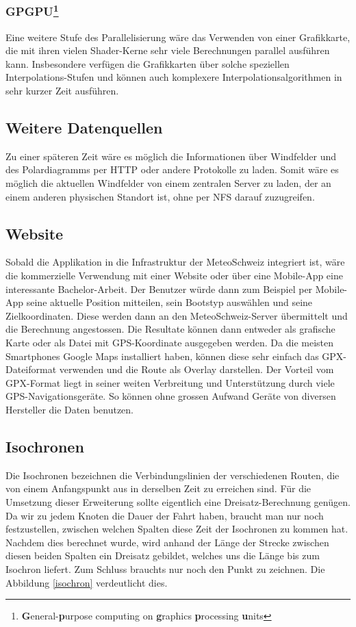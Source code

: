 \subsubsection{GPGPU\protect\footnote{\textbf{G}eneral-\textbf{p}urpose computing on \textbf{g}raphics \textbf{p}rocessing \textbf{u}nits}}
Eine weitere Stufe des Parallelisierung wäre das Verwenden von einer
Grafikkarte, die mit ihren vielen Shader-Kerne sehr viele Berechnungen
parallel ausführen kann. Insbesondere verfügen die Grafikkarten über solche
speziellen Interpolations-Stufen und können auch komplexere
Interpolationsalgorithmen in sehr kurzer Zeit ausführen.
 
\subsection{Weitere Datenquellen}
Zu einer späteren Zeit wäre es möglich die Informationen über Windfelder und
des Polardiagramms per HTTP oder andere Protokolle zu laden. Somit wäre es
möglich die aktuellen Windfelder von einem zentralen Server zu laden, der an
einem anderen physischen Standort ist, ohne per NFS darauf zuzugreifen.

\subsection{Website}
Sobald die Applikation in die Infrastruktur der MeteoSchweiz integriert ist,
wäre die kommerzielle Verwendung mit einer Website oder über eine Mobile-App
eine interessante Bachelor-Arbeit. Der Benutzer würde dann zum Beispiel per
Mobile-App seine aktuelle Position mitteilen, sein Bootstyp auswählen und
seine Zielkoordinaten. Diese werden dann an den MeteoSchweiz-Server
übermittelt und die Berechnung angestossen. Die Resultate können dann entweder
als grafische Karte oder als Datei mit GPS-Koordinate ausgegeben werden. Da
die meisten Smartphones Google Maps installiert haben, können diese sehr
einfach das GPX-Dateiformat verwenden und die Route als Overlay darstellen.
Der Vorteil vom GPX-Format liegt in seiner weiten Verbreitung und
Unterstützung durch viele GPS-Navigationsgeräte. So können ohne grossen
Aufwand Geräte von diversen Hersteller die Daten benutzen.

\subsection{Isochronen}
Die Isochronen bezeichnen die Verbindungslinien der verschiedenen Routen, die
von einem Anfangspunkt aus in derselben Zeit zu erreichen sind.  Für die
Umsetzung dieser Erweiterung sollte eigentlich eine Dreisatz-Berechnung
genügen. Da wir zu jedem Knoten die Dauer der Fahrt haben, braucht man nur
noch festzustellen, zwischen welchen Spalten diese Zeit der Isochronen zu
kommen hat. Nachdem dies berechnet wurde, wird anhand der Länge der Strecke
zwischen diesen beiden Spalten ein Dreisatz gebildet, welches uns die Länge
bis zum Isochron liefert. Zum Schluss brauchts nur noch den Punkt zu zeichnen.
Die Abbildung \ref{isochron} verdeutlicht dies.

